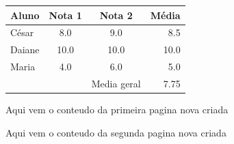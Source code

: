 \documentclass[12pt,a4paper]{article}
\begin{document}
\begin{center}
\begin{tabular}{l|c|c|r} 




\hline
Aluno & Nota 1 & Nota 2 & Média \\ \hline
César & 8.0 & 9.0 & 8.5 \\ 
Daiane & 10.0 & 10.0 & 10.0 \\
Maria & 4.0 & 6.0 & 5.0 \\ \hline
& & Media geral & 7.75 \\ \hline

\end{tabular}
\end{center}

\newpage %
Aqui vem o conteudo da primeira pagina nova criada

\newpage %
Aqui vem o conteudo da segunda pagina nova criada
\end{document}
